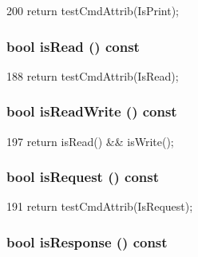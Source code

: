 \begin{DoxyCode}
200 { return testCmdAttrib(IsPrint); }
\end{DoxyCode}
\hypertarget{classMemCmd_adc47901747fc3c447db3abddaf01491a}{
\subsubsection[{isRead}]{\setlength{\rightskip}{0pt plus 5cm}bool isRead () const}}
\label{classMemCmd_adc47901747fc3c447db3abddaf01491a}



\begin{DoxyCode}
188 { return testCmdAttrib(IsRead); }
\end{DoxyCode}
\hypertarget{classMemCmd_aa05746eae63aee1fb4758c13d0301a9f}{
\subsubsection[{isReadWrite}]{\setlength{\rightskip}{0pt plus 5cm}bool isReadWrite () const}}
\label{classMemCmd_aa05746eae63aee1fb4758c13d0301a9f}



\begin{DoxyCode}
197 { return isRead() && isWrite(); }
\end{DoxyCode}
\hypertarget{classMemCmd_af21986d725d75fa8e1b6c83457cd4501}{
\subsubsection[{isRequest}]{\setlength{\rightskip}{0pt plus 5cm}bool isRequest () const}}
\label{classMemCmd_af21986d725d75fa8e1b6c83457cd4501}



\begin{DoxyCode}
191 { return testCmdAttrib(IsRequest); }
\end{DoxyCode}
\hypertarget{classMemCmd_a5f89a108755a6cb3e8185d85c850a816}{
\subsubsection[{isResponse}]{\setlength{\rightskip}{0pt plus 5cm}bool isResponse () const}}
\label{classMemCmd_a5f89a108755a6cb3e8185d85c850a816}



